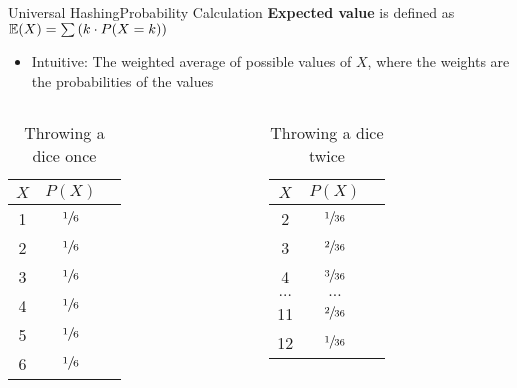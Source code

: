 \begin{frame}{Universal Hashing}{Probability Calculation}
  \textbf{Expected value} is defined as  {\color{MainA}$\mathbb{E}(X)  = \sum \left(k \cdot P(X = k)\right)$}
  \vspace*{0em}
  \begin{itemize}
    \item <2->
      Intuitive: The weighted average of possible values of {\color{MainA}$X$}, where
      the weights are the probabilities of the values
  \end{itemize}
  \vspace*{-1.0em}
 \begin{columns}
   \begin{column}{0.5\linewidth}
     \begin{table}[!h]
       \small{
     \caption{Throwing a dice once}
    \label{tab:probabilities:value_rolling_dice_once}
    \begin{tabularx}{0.25\linewidth}{c|cc}
      {\color{MainA}$X$} & {\color{MainA}$P(X)$}\\
      \midrule
      1 & $\sfrac{1}{6}$\\
      2 & $\sfrac{1}{6}$\\
      3 & $\sfrac{1}{6}$\\
      4 & $\sfrac{1}{6}$\\
      5 & $\sfrac{1}{6}$\\
      6 & $\sfrac{1}{6}$\\
    \end{tabularx}}
  \end{table}  
   \end{column}
   \begin{column}{0.5\linewidth}
     \begin{table}[!h]
       \small{
    \caption{Throwing a dice twice}
    \label{tab:probabilities:value_rolling_dice_twice}
    \begin{tabularx}{0.275\linewidth}{c|cc}
      {\color{MainA}$X$ }&{\color{MainA} $P(X)$}\\
      \midrule
      2 & $\sfrac{1}{36}$\\
      3 & $\sfrac{2}{36}$\\
      4 & $\sfrac{3}{36}$\\
      $\dots$ & $\dots$\\
      11 & $\sfrac{2}{36}$\\
      12 & $\sfrac{1}{36}$\\
    \end{tabularx}}

\end{table}
\end{column}
\end{columns}
\end{frame}
